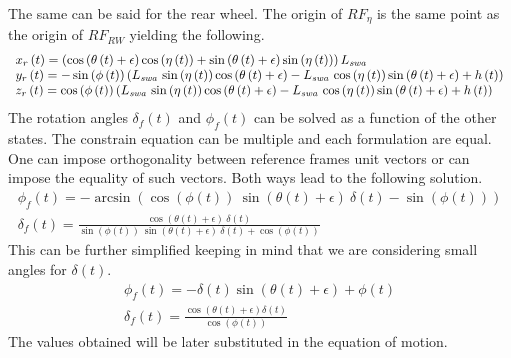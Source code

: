 \normalsize
%
The same can be said for the rear wheel. The origin of $RF_{\eta}$ is the same point as the origin of $RF_{RW}$ yielding the following.
%
\footnotesize
\begin{equation}
    \begin{array}{l} x_{r} \left( t \right) = \left( \cos \left( 
        \theta \left( t \right) +\epsilon \right) \cos \left( \eta \left( t
         \right)  \right) +\sin \left( \theta \left( t \right) +\epsilon
         \right) \sin \left( \eta \left( t \right)  \right)  \right) L_{{\it 
        swa}}\\ y_{r} \left( t \right) =-\sin \left( \phi
         \left( t \right)  \right)  \left( L_{{\it swa}}\,\sin \left( \eta
         \left( t \right)  \right) \cos \left( \theta \left( t \right) +
        \epsilon \right) -L_{{\it swa}}\,\cos \left( \eta \left( t \right) 
         \right) \sin \left( \theta \left( t \right) +\epsilon \right) +h
         \left( t \right)  \right) \\ z_{r} \left( t
         \right) =\cos \left( \phi \left( t \right)  \right)  \left( L_{{\it 
        swa}}\,\sin \left( \eta \left( t \right)  \right) \cos \left( \theta
         \left( t \right) +\epsilon \right) -L_{{\it swa}}\,\cos \left( \eta
         \left( t \right)  \right) \sin \left( \theta \left( t \right) +
        \epsilon \right) +h \left( t \right)  \right) \end{array}
\end{equation}
\normalsize
%
The rotation angles $\delta_f(t)$ and $\phi_f(t)$ can be solved as a function of the other states.
The constrain equation can be multiple and each formulation are equal. One can impose orthogonality between reference frames unit vectors or can impose the equality of such vectors. Both ways lead to the following solution.
%
\begin{equation}
\begin{array}{l} \phi_{f} \left(t \right)=-\arcsin \left(
\cos \left(\phi \left(t \right)\right)~\sin \left(\theta \left(t 
\right)+\epsilon \right)~\delta \left(t \right)-\sin \left(\phi \left(
t \right)\right)\right)\\ 
\displaystyle
\delta_{f} \left(t \right)
=\frac{\cos \left(\theta \left(t \right)+\epsilon \right)~\delta 
\left(t \right)}{\sin \left(\phi \left(t \right)\right)~\sin \left(
\theta \left(t \right)+\epsilon \right)~\delta \left(t \right)+\cos 
\left(\phi \left(t \right)\right)}\end{array}
\end{equation} 
%
This can be further simplified keeping in mind that we are considering small angles for $\delta(t)$.
%
\begin{equation}
    \begin{array}{l} \phi_{f} \left( t \right) =-\delta \left( t
    \right) \sin \left( \theta \left( t \right) +\epsilon \right) +\phi
    \left( t \right) \\ 
    \displaystyle
    \delta_{f} \left( t \right) ={
    \frac {\cos \left( \theta \left( t \right) +\epsilon \right) \delta
    \left( t \right) }{\cos \left( \phi \left( t \right)  \right) }}
   \end{array} 
\end{equation}
%
The values obtained will be later substituted in the equation of motion.
%
